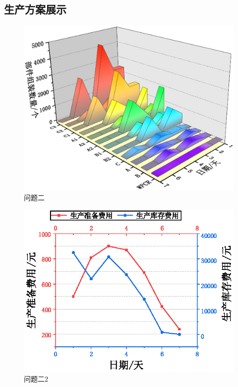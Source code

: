 \subsection{生产方案展示} %
\label{sub:生产方案展示}

\begin{figure}[!htbp]
	\centering
	\includegraphics{Image/问题二展示.eps}
	\caption{问题二}\label{每日组件组装数量}
\end{figure}

\begin{figure}[!htbp]
	\centering
	\includegraphics{Image/问题二展示2.eps}
	\caption{问题二2}\label{每日成本费用}
\end{figure}

